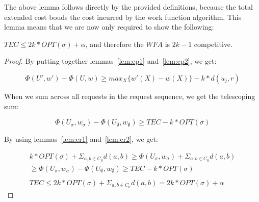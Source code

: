 The above lemma follows directly by the provided definitions, because the total extended cost bouds the cost incurred by the work function algorithm. This lemma means that we are now only required to show the following:

\begin{lemma}
    $TEC \leq 2k * OPT(\sigma) + \alpha$, and therefore the $WFA$ is $2k-1$ competitive.
\end{lemma}

\begin{proof}
    By putting together lemmas~\ref{lem:ep1} and~\ref{lem:ep2}, we get:

    \begin{equation*}
        \Phi(U', w') - \Phi(U, w) \geq max_X\{ w'(X) - w(X)\} -k * d(u_j, r)
    \end{equation*}

    When we sum across all requests in the request sequence, we get the telescoping sum:

    \begin{equation*}
        \Phi(U_\sigma, w_\sigma) - \Phi(U_\emptyset, w_\emptyset) \geq TEC - k*OPT(\sigma)
    \end{equation*}

    By using lemmas~\ref{lem:er1} and~\ref{lem:er2}, we get:

    \begin{equation*}
        \begin{gathered}
            k * OPT(\sigma)+ \Sigma_{a, b \in C_0} d(a, b) \geq \Phi(U_\sigma, w_\sigma) + \Sigma_{a, b \in C_0} d(a, b) \\
            \geq \Phi(U_\sigma, w_\sigma) - \Phi(U_\emptyset, w_\emptyset) \geq TEC - k*OPT(\sigma)\\ \\
            TEC \leq 2k * OPT(\sigma) + \Sigma_{a, b \in C_0} d(a, b) = 2k * OPT(\sigma) + \alpha
        \end{gathered}
    \end{equation*}
\end{proof}